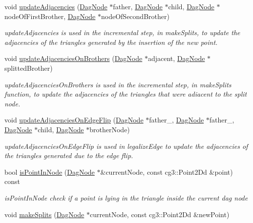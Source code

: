 \begin{DoxyCompactItemize}
void \hyperlink{classDelaunayTriangulationAlgorithm_a694de9b5606f5ac3a7a7fa66c83a2cf2}{update\+Adjacencies} (\hyperlink{classDagNode}{Dag\+Node} $\ast$father, \hyperlink{classDagNode}{Dag\+Node} $\ast$child, \hyperlink{classDagNode}{Dag\+Node} $\ast$node\+Of\+First\+Brother, \hyperlink{classDagNode}{Dag\+Node} $\ast$node\+Of\+Second\+Brother)
\begin{DoxyCompactList}\small\item\em update\+Adjacencies is used in the incremental step, in make\+Splits, to update the adjacencies of the triangles generated by the insertion of the new point. \end{DoxyCompactList}\item 
void \hyperlink{classDelaunayTriangulationAlgorithm_a4a9046271562e1bfee005071327e2854}{update\+Adjacencies\+On\+Brothers} (\hyperlink{classDagNode}{Dag\+Node} $\ast$adjacent, \hyperlink{classDagNode}{Dag\+Node} $\ast$splitted\+Brother)
\begin{DoxyCompactList}\small\item\em update\+Adjacencies\+On\+Brothers is used in the incremental step, in make\+Splits function, to update the adjacencies of the triangles that were adiacent to the split node. \end{DoxyCompactList}\item 
void \hyperlink{classDelaunayTriangulationAlgorithm_ab8c3edba575e0a95497fc093b4673ab9}{update\+Adjacencies\+On\+Edge\+Flip} (\hyperlink{classDagNode}{Dag\+Node} $\ast$father\+\_, \hyperlink{classDagNode}{Dag\+Node} $\ast$father\+\_, \hyperlink{classDagNode}{Dag\+Node} $\ast$child, \hyperlink{classDagNode}{Dag\+Node} $\ast$brother\+Node)
\begin{DoxyCompactList}\small\item\em update\+Adjacencies\+On\+Edge\+Flip is used in legalize\+Edge to update the adjacencies of the triangles generated due to the edge flip. \end{DoxyCompactList}\item 
bool \hyperlink{classDelaunayTriangulationAlgorithm_a656aa7b63de6e6ccd1ce2063f0a5bbc9}{is\+Point\+In\+Node} (\hyperlink{classDagNode}{Dag\+Node} $\ast$\&current\+Node, const cg3\+::\+Point2\+Dd \&point) const
\begin{DoxyCompactList}\small\item\em is\+Point\+In\+Node check if a point is lying in the triangle inside the current dag node \end{DoxyCompactList}\item 
void \hyperlink{classDelaunayTriangulationAlgorithm_accb8c238968145f3ce0bac23dbc4536f}{make\+Splits} (\hyperlink{classDagNode}{Dag\+Node} $\ast$current\+Node, const cg3\+::\+Point2\+Dd \&new\+Point)

\end{DoxyCompactItemize}
